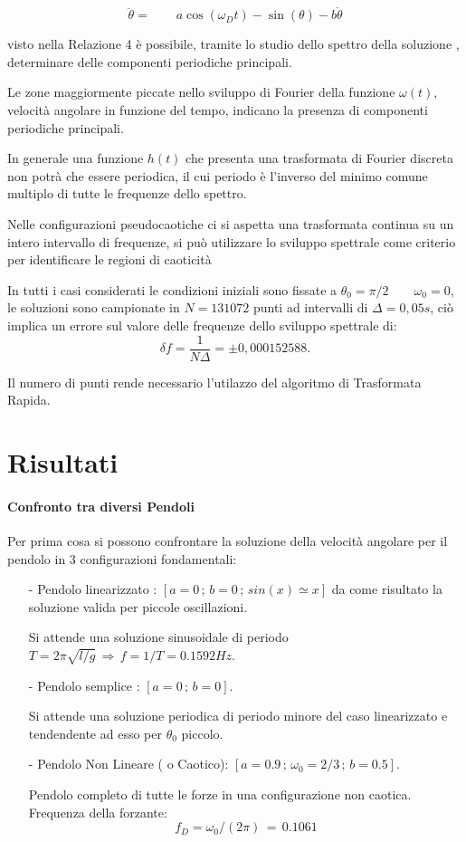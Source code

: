 \documentclass[13pt]{article}
\begin{document}
	\begin{equation}
\ddot{\theta}  = \qquad a\cos(\omega_{D} t) - \sin(\theta) -b \dot{\theta}
	\end{equation}

visto nella Relazione 4 è possibile, tramite lo studio dello spettro della soluzione , determinare delle componenti periodiche principali.

Le zone maggiormente piccate nello sviluppo di Fourier della funzione $\omega(t)$, velocità angolare in funzione del tempo, indicano la presenza di componenti periodiche principali.

In generale una funzione $h(t)$ che presenta una trasformata di Fourier discreta non potrà che essere periodica, il cui periodo è l'inverso del minimo comune multiplo di tutte le frequenze dello spettro.

Nelle configurazioni pseudocaotiche ci si aspetta una trasformata continua su un intero intervallo di frequenze, si può utilizzare lo sviluppo spettrale come criterio per identificare le regioni di caoticità


In tutti i casi considerati le condizioni iniziali sono fissate a $\theta_{0} = \pi / 2 \qquad \omega_{0} = 0$, le soluzioni sono campionate in $N = 131072$ punti ad intervalli di $\Delta = 0,05 s$, ciò implica un errore sul valore delle frequenze dello sviluppo spettrale di: 
$$ \delta f = \dfrac{1}{N \Delta} = \pm 0,000152588 .$$

Il numero di punti rende necessario l'utilazzo del algoritmo di Trasformata Rapida.

\section{Risultati}
\paragraph{Confronto tra diversi Pendoli}

Per prima cosa si possono confrontare la soluzione della velocità angolare per il pendolo in 3 configurazioni fondamentali:
	\begin{itemize}
	\item[-] Pendolo linearizzato : $[ a = 0 \, ;\, b = 0 \, ;\, sin(x) \simeq x ]$ da come risultato la soluzione valida per piccole oscillazioni.

Si attende una soluzione sinusoidale di periodo $T = 2 \pi \sqrt{l/g}\, \Rightarrow \, f = 1/T = 0.1592 Hz$.
	
\item[-] Pendolo semplice : $[ a = 0 \, ;\, b = 0 ]$.

Si attende una soluzione periodica di periodo minore del caso linearizzato e tendendente ad esso per $\theta_{0}$ piccolo.

\item[-] Pendolo Non Lineare ( o Caotico): $[ a = 0.9 \, ;\, \omega_{0} = 2/3 \, ;\, b = 0.5 ]$.

Pendolo completo di tutte le forze in una configurazione non caotica. Frequenza della forzante: $$f_{D} = \omega_{0}/(2 \pi) \, = \,0.1061$$ 
	\end{itemize} 
\end{document}
